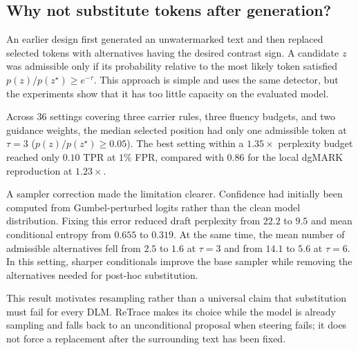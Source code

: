 \subsection{Why not substitute tokens after generation?}
\label{sec:v1}

An earlier design first generated an unwatermarked text and then replaced selected tokens
with alternatives having the desired contrast sign. A candidate $z$ was admissible only if
its probability relative to the most likely token satisfied
$p(z)/p(z^\star)\geq e^{-\tau}$. This approach is simple and uses the same detector, but
the experiments show that it has too little capacity on the evaluated model.

Across 36 settings covering three carrier rules, three fluency budgets, and two guidance
weights, the median selected position had only one admissible token at $\tau=3$
($p(z)/p(z^\star)\geq0.05$). The best setting within a $1.35\times$ perplexity budget
reached only $0.10$ TPR at $1\%$ FPR, compared with $0.86$ for the local dgMARK
reproduction at $1.23\times$.

A sampler correction made the limitation clearer. Confidence had initially been computed
from Gumbel-perturbed logits rather than the clean model distribution. Fixing this error
reduced draft perplexity from $22.2$ to $9.5$ and mean conditional entropy from $0.655$ to
$0.319$. At the same time, the mean number of admissible alternatives fell from $2.5$ to
$1.6$ at $\tau=3$ and from $14.1$ to $5.6$ at $\tau=6$. In this setting, sharper
conditionals improve the base sampler while removing the alternatives needed for post-hoc
substitution.

This result motivates resampling rather than a universal claim that substitution must fail
for every DLM. ReTrace makes its choice while the model is already sampling and falls back
to an unconditional proposal when steering fails; it does not force a replacement after
the surrounding text has been fixed.
